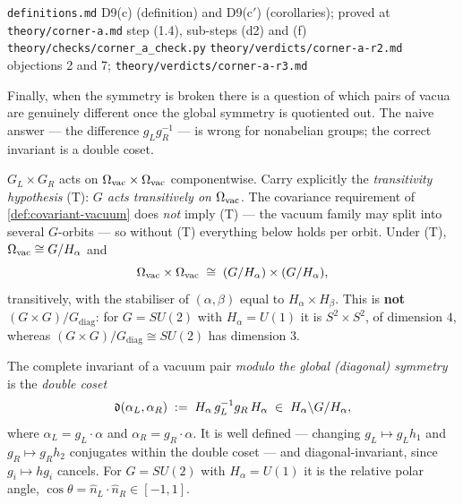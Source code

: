 %
{\texttt{definitions.md} D9(c) (definition) and D9(c$'$) (corollaries);
 proved at \texttt{theory/corner-a.md} step (1.4), sub-steps (d2) and (f)}%
{\texttt{theory/checks/corner\_a\_check.py}}%
{\texttt{theory/verdicts/corner-a-r2.md} objections 2 and 7;
 \texttt{theory/verdicts/corner-a-r3.md}}

Finally, when the symmetry is broken there is a question of which pairs of
vacua are genuinely different once the global symmetry is quotiented out. The
naive answer --- the difference $g_{L} g_{R}^{-1}$ --- is wrong for nonabelian
groups; the correct invariant is a double coset.

\begin{definition}
\label{def:vacuum-pair-invariant}
$G_{L} \times G_{R}$ acts on $\Omega_{\mathrm{vac}} \times \Omega_{\mathrm{vac}}$ componentwise. Carry
explicitly the \emph{transitivity hypothesis} (T): \emph{$G$ acts transitively
on $\Omega_{\mathrm{vac}}$}. The covariance requirement of \cref{def:covariant-vacuum} does
\emph{not} imply (T) --- the vacuum family may split into several $G$-orbits
--- so without (T) everything below holds per orbit. Under (T),
$\Omega_{\mathrm{vac}} \cong G/H_{\alpha}$ and
\begin{equation}
  \Omega_{\mathrm{vac}} \times \Omega_{\mathrm{vac}} \;\cong\; (G/H_{\alpha}) \times (G/H_{\alpha}),
\end{equation}
transitively, with the stabiliser of $(\alpha,\beta)$ equal to
$H_{\alpha} \times H_{\beta}$. This is \textbf{not} $(G \times G)/G_{\mathrm{diag}}$:
for $G = SU(2)$ with $H_{\alpha} = U(1)$ it is $S^{2} \times S^{2}$, of
dimension $4$, whereas $(G \times G)/G_{\mathrm{diag}} \cong SU(2)$ has
dimension $3$.

The complete invariant of a vacuum pair \emph{modulo the global (diagonal)
symmetry} is the \emph{double coset}
\begin{equation}
  \mathfrak{d}(\alpha_{L}, \alpha_{R})
  \; := \; H_{\alpha} \, g_{L}^{-1} g_{R} \, H_{\alpha}
  \;\in\; H_{\alpha} \backslash G / H_{\alpha},
  \label{eq:double-coset}
\end{equation}
where $\alpha_{L} = g_{L} \cdot \alpha$ and $\alpha_{R} = g_{R} \cdot \alpha$.
It is well defined --- changing $g_{L} \mapsto g_{L} h_{1}$ and
$g_{R} \mapsto g_{R} h_{2}$ conjugates within the double coset --- and
diagonal-invariant, since $g_{i} \mapsto h g_{i}$ cancels. For $G = SU(2)$
with $H_{\alpha} = U(1)$ it is the relative polar angle,
$\cos \theta = \hat{n}_{L} \cdot \hat{n}_{R} \in [-1,1]$.
\end{definition}

